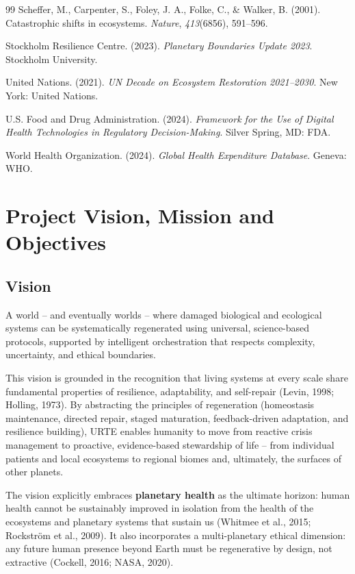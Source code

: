 \documentclass[11pt,a4paper]{article}
\begin{document}
\begin{thebibliography}{99}
Scheffer, M., Carpenter, S., Foley, J. A., Folke, C., \& Walker, B. (2001). Catastrophic shifts in ecosystems. \textit{Nature}, \textit{413}(6856), 591--596.

Stockholm Resilience Centre. (2023). \textit{Planetary Boundaries Update 2023}. Stockholm University.

United Nations. (2021). \textit{UN Decade on Ecosystem Restoration 2021--2030}. New York: United Nations.

U.S. Food and Drug Administration. (2024). \textit{Framework for the Use of Digital Health Technologies in Regulatory Decision-Making}. Silver Spring, MD: FDA.

World Health Organization. (2024). \textit{Global Health Expenditure Database}. Geneva: WHO.

\end{thebibliography}

\section{Project Vision, Mission and Objectives}

\subsection{Vision}

A world -- and eventually worlds -- where damaged biological and ecological systems can be systematically regenerated using universal, science-based protocols, supported by intelligent orchestration that respects complexity, uncertainty, and ethical boundaries.

This vision is grounded in the recognition that living systems at every scale share fundamental properties of resilience, adaptability, and self-repair (Levin, 1998; Holling, 1973). By abstracting the principles of regeneration (homeostasis maintenance, directed repair, staged maturation, feedback-driven adaptation, and resilience building), URTE enables humanity to move from reactive crisis management to proactive, evidence-based stewardship of life -- from individual patients and local ecosystems to regional biomes and, ultimately, the surfaces of other planets.

The vision explicitly embraces \textbf{planetary health} as the ultimate horizon: human health cannot be sustainably improved in isolation from the health of the ecosystems and planetary systems that sustain us (Whitmee et al., 2015; Rockström et al., 2009). It also incorporates a multi-planetary ethical dimension: any future human presence beyond Earth must be regenerative by design, not extractive (Cockell, 2016; NASA, 2020).
\end{document}
